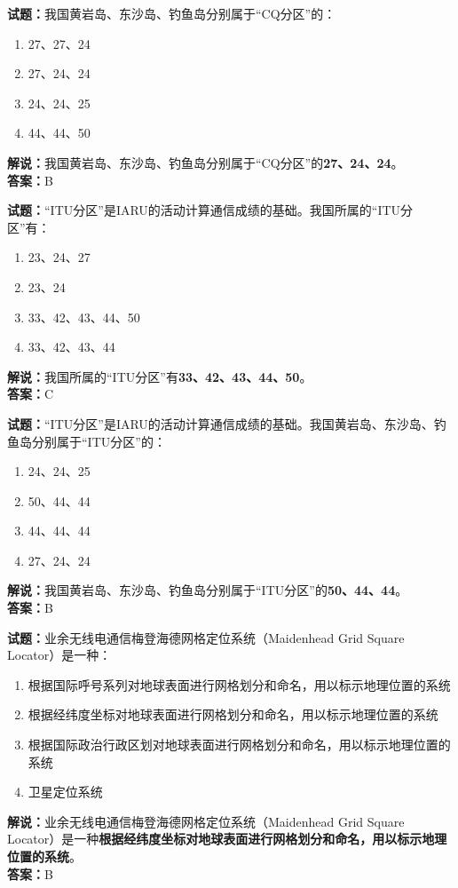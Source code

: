 \documentclass{ctexbook}
\begin{document}
\bigskip


\noindent\textbf{试题：}我国黄岩岛、东沙岛、钓鱼岛分别属于“CQ分区”的：
\begin{enumerate}[leftmargin=3em]
\item 27、27、24
\item 27、24、24
\item 24、24、25
\item 44、44、50
\end{enumerate}
\noindent\textbf{解说：}我国黄岩岛、东沙岛、钓鱼岛分别属于“CQ分区”的\textbf{27、24、24}。\\\noindent\textbf{答案：}B


\bigskip


\noindent\textbf{试题：}“ITU分区”是IARU的活动计算通信成绩的基础。我国所属的“ITU分区”有：
\begin{enumerate}[leftmargin=3em]
\item 23、24、27
\item 23、24
\item 33、42、43、44、50
\item 33、42、43、44
\end{enumerate}
\noindent\textbf{解说：}我国所属的“ITU分区”有\textbf{33、42、43、44、50}。\\\noindent\textbf{答案：}C



\bigskip


\noindent\textbf{试题：}“ITU分区”是IARU的活动计算通信成绩的基础。我国黄岩岛、东沙岛、钓鱼岛分别属于“ITU分区”的：
\begin{enumerate}[leftmargin=3em]
\item 24、24、25
\item 50、44、44
\item 44、44、44
\item 27、24、24
\end{enumerate}
\noindent\textbf{解说：}我国黄岩岛、东沙岛、钓鱼岛分别属于“ITU分区”的\textbf{50、44、44}。\\\noindent\textbf{答案：}B




\bigskip


\noindent\textbf{试题：}业余无线电通信梅登海德网格定位系统（Maidenhead Grid Square Locator）是一种：
\begin{enumerate}[leftmargin=3em]
\item 根据国际呼号系列对地球表面进行网格划分和命名，用以标示地理位置的系统
\item 根据经纬度坐标对地球表面进行网格划分和命名，用以标示地理位置的系统
\item 根据国际政治行政区划对地球表面进行网格划分和命名，用以标示地理位置的系统
\item 卫星定位系统
\end{enumerate}
\noindent\textbf{解说：}业余无线电通信梅登海德网格定位系统（Maidenhead Grid Square Locator）是一种\textbf{根据经纬度坐标对地球表面进行网格划分和命名，用以标示地理位置的系统}。\\\noindent\textbf{答案：}B
\end{document}
